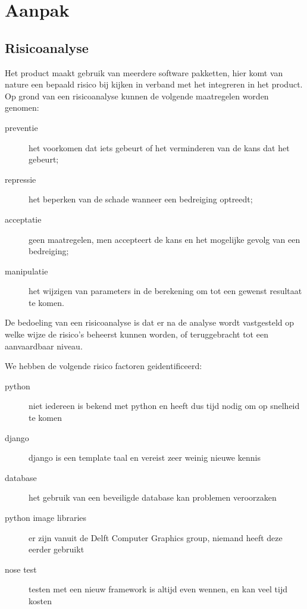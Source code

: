 \section{Aanpak}
\label{aanpak_en_tijdsplanning}






\subsection{Risicoanalyse}

Het product maakt gebruik van meerdere software pakketten,
hier komt van nature een bepaald risico bij kijken in verband met het integreren in het product.
Op grond van een risicoanalyse kunnen de volgende maatregelen worden genomen:
\begin{description}
    \item[preventie] het voorkomen dat iets gebeurt of het verminderen van de kans dat het gebeurt;
    \item[repressie] het beperken van de schade wanneer een bedreiging optreedt;
    \item[acceptatie] geen maatregelen, men accepteert de kans en het mogelijke gevolg van een bedreiging;
    \item[manipulatie] het wijzigen van parameters in de berekening om tot een gewenst resultaat te komen.
\end{description}

De bedoeling van een risicoanalyse is dat er na de analyse wordt vastgesteld op welke wijze de risico's beheerst kunnen worden, of teruggebracht tot een aanvaardbaar niveau. \cite{wiki:risico_analyse}

We hebben de volgende risico factoren geidentificeerd:
\begin{description}
    \item[python] niet iedereen is bekend met python en heeft dus tijd nodig om op snelheid te komen
    \item[django] django is een template taal en vereist zeer weinig nieuwe kennis
    \item[database] het gebruik van een beveiligde database kan problemen veroorzaken
    \item[python image libraries] er zijn vanuit de Delft Computer Graphics group, niemand heeft deze eerder gebruikt
    \item[nose test] testen met een nieuw framework is altijd even wennen, en kan veel tijd kosten
\end{description}

